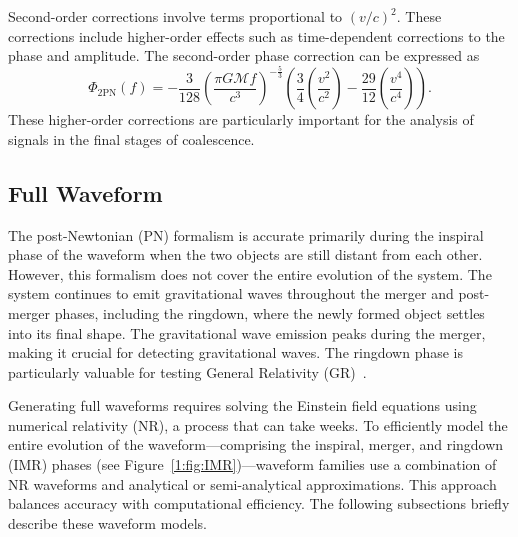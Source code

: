 Second-order corrections involve terms proportional to \( (v/c)^2 \). These corrections include higher-order effects such as time-dependent corrections to the phase and amplitude. The second-order phase correction can be expressed as
%
\begin{equation}
    \Phi_{\text{2PN}}(f) = -\frac{3}{128} \left(\frac{\pi G \mathcal{M} f}{c^3}\right)^{-\frac{5}{3}} \left( \frac{3}{4} \left(\frac{v^2}{c^2}\right) - \frac{29}{12} \left(\frac{v^4}{c^4}\right) \right).
\end{equation}
%
These higher-order corrections are particularly important for the analysis of signals in the final stages of coalescence.

\subsection{\label{2:sec:full_waveform}Full Waveform}

The post-Newtonian (PN) formalism is accurate primarily during the inspiral phase of the waveform when the two objects are still distant from each other. However, this formalism does not cover the entire evolution of the system. The system continues to emit gravitational waves throughout the merger and post-merger phases, including the ringdown, where the newly formed object settles into its final shape. The gravitational wave emission peaks during the merger, making it crucial for detecting gravitational waves. The ringdown phase is particularly valuable for testing General Relativity (GR)~\cite{GW150914_TGR:2016, GW170817_TGR:2019, O3_TGR:2021}.

Generating full waveforms requires solving the Einstein field equations using numerical relativity (NR), a process that can take weeks. To efficiently model the entire evolution of the waveform---comprising the inspiral, merger, and ringdown (IMR) phases (see Figure~\ref{1:fig:IMR})---waveform families use a combination of NR waveforms and analytical or semi-analytical approximations. This approach balances accuracy with computational efficiency. The following subsections briefly describe these waveform models.

